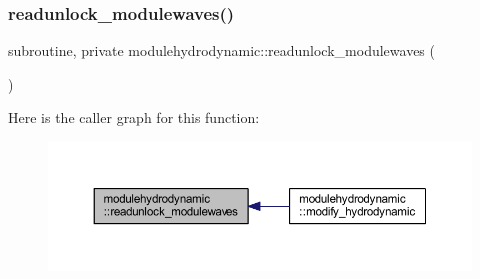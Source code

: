 \subsubsection{\texorpdfstring{readunlock\+\_\+modulewaves()}{readunlock\_modulewaves()}}
{\footnotesize\ttfamily subroutine, private modulehydrodynamic\+::readunlock\+\_\+modulewaves (\begin{DoxyParamCaption}{ }\end{DoxyParamCaption})\hspace{0.3cm}{\ttfamily [private]}}

Here is the caller graph for this function\+:\nopagebreak
\begin{figure}[H]
\begin{center}
\leavevmode
\includegraphics[width=350pt]{namespacemodulehydrodynamic_a652c0bf5742de7f1bc1ccdd771297bbc_icgraph}
\end{center}
\end{figure}
\mbox{\label{namespacemodulehydrodynamic_afeaf24401841ea327d58dcaa1b45a92f}} 
